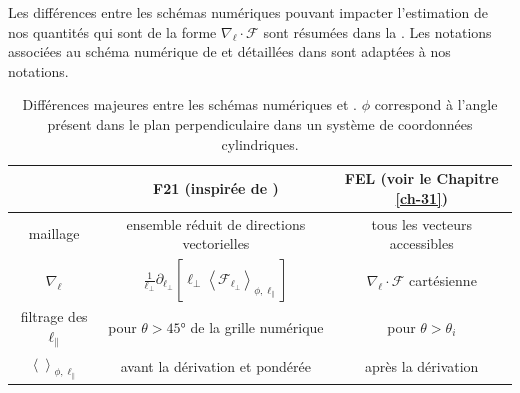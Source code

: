  Les différences entre les schémas numériques pouvant impacter l'estimation de nos quantités qui sont de la forme $\nabla _{\boldsymbol{\ell}} \cdot  \boldsymbol{\mathcal{F}}$ sont résumées dans la . Les notations associées au schéma numérique de  et détaillées dans \cite{ferrand_multi-scale_2021} sont adaptées à nos notations. 
  \begin{table}[!ht]
 \begin{center}
 \begin{tabular}{ c|c|c } 
  & F21 (inspirée de \cite{taylor_recovering_2003}) & FEL (voir le Chapitre \ref{ch-31})\\
 \hline
 maillage & ensemble réduit de directions vectorielles & tous les vecteurs accessibles \\
 $\nabla_{\boldsymbol{\ell}}$ & $\frac{1}{\ell_{\perp}} \partial_{\ell_{\perp}} \left[\ell_{\perp} \left<\mathcal{F}_{\ell_{\perp}}\right>_{\phi, \ell_{\parallel}}\right]$ & $\nabla_{\boldsymbol{\ell}} \cdot \boldsymbol{\mathcal{F}}$ cartésienne \\
 filtrage des $\ell_{\parallel}$ & pour $\theta > \ang{45} $ de la grille numérique & pour $\theta > \theta_i$ \\
 $\left<\right>_{\phi,\ell_{\parallel}}$ & avant la dérivation et pondérée & après la dérivation 
 \end{tabular}
 \cprotect\caption{Différences majeures entre les schémas numériques  et . \ensuremath{\phi} correspond à l'angle présent dans le plan perpendiculaire dans un système de coordonnées cylindriques. }\label{tab:compa_F21-FEL}
 \end{center}
 \end{table}
 

